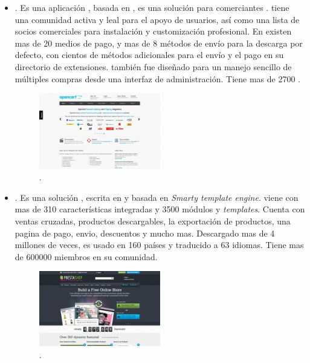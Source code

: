 \begin{itemize}
	\item \textbf{\nameOpenCart}. Es una aplicación \opensource, basada en \php, es una solución \ecommerce para comerciantes \online. \nameOpenCart tiene una comunidad activa y leal para el apoyo de usuarios, así como una lista de socios comerciales para instalación y customización profesional. En \nameOpenCart existen mas de 20 medios de pago, y mas de 8 métodos de envío para la descarga por defecto, con cientos de métodos adicionales para el envío y el pago en su directorio de extensiones. \nameOpenCart también fue diseñado para un manejo sencillo de múltiples compras desde una interfaz de administración. Tiene mas de 2700 \themes.
	
	\begin{figure}[H]
		\centering
		\includegraphics[width=0.5\textwidth]{figuras/cap1/openCartWebsite.jpg}
		\caption{\nameOpenCart \website \cite{online_OpenCartWebsite}.}
	\end{figure}


	\item \textbf{\namePrestaShop}. Es una solución \ecommerce \opensource, escrita en \php y basada en \textit{Smarty template engine}. \namePrestaShop viene con mas de 310 características integradas y 3500 módulos y \textit{templates}. Cuenta con ventas cruzadas, productos descargables, la exportación de productos, una pagina de pago, envio, descuentos y mucho mas. Descargado mas de 4 millones de veces, \namePrestaShop es usado en 160 países y traducido a 63 idiomas. Tiene mas de 600000 miembros en su comunidad.

	\begin{figure}[H]
		\centering
		\includegraphics[width=0.5\textwidth]{figuras/cap1/PrestaShopWebsite.jpg}
		\caption{\namePrestaShop \website \cite{online_PrestaShop}.}
	\end{figure}



\end{itemize}
